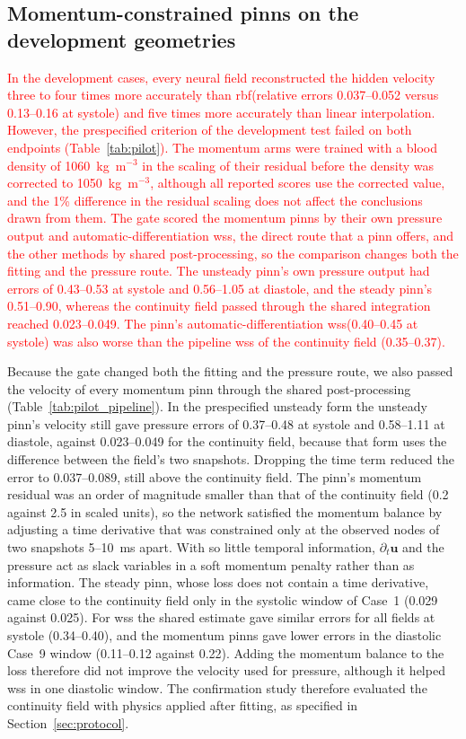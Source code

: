 \documentclass[12pt,a4paper]{article}
\newcommand{\PINN}{\ac{pinn}\xspace}
\newcommand{\PINNs}{\acp{pinn}\xspace}
\newcommand{\WSS}{\ac{wss}\xspace}
\newcommand{\RBF}{\ac{rbf}\xspace}
\theoremstyle{definition}
\numberwithin{equation}{section}
\newcommand{\revision}[1]{\textcolor{red}{#1}}
\begin{document}


\subsection{Momentum-constrained \texorpdfstring{\PINNs}{PINNs} on the development geometries}
\label{sec:pilot_results}
\revision{In the development cases, every neural field reconstructed the hidden velocity three to four times more accurately than \RBF (relative errors 0.037--0.052 versus 0.13--0.16 at systole) and five times more accurately than linear interpolation. However, the prespecified criterion of the development test failed on both endpoints (Table~\ref{tab:pilot}). The momentum arms were trained with a blood density of 1060~kg~m$^{-3}$ in the scaling of their residual before the density was corrected to 1050~kg~m$^{-3}$, although all reported scores use the corrected value, and the 1\% difference in the residual scaling does not affect the conclusions drawn from them. The gate scored the momentum \PINNs by their own pressure output and automatic-differentiation \WSS, the direct route that a \PINN offers, and the other methods by shared post-processing, so the comparison changes both the fitting and the pressure route. The unsteady \PINN's own pressure output had errors of 0.43--0.53 at systole and 0.56--1.05 at diastole, and the steady \PINN's 0.51--0.90, whereas the continuity field passed through the shared integration reached 0.023--0.049. The \PINN's automatic-differentiation \WSS (0.40--0.45 at systole) was also worse than the pipeline \WSS of the continuity field (0.35--0.37).}

Because the gate changed both the fitting and the pressure route, we also passed the velocity of every momentum \PINN through the shared post-processing (Table~\ref{tab:pilot_pipeline}). In the prespecified unsteady form the unsteady \PINN's velocity still gave pressure errors of 0.37--0.48 at systole and 0.58--1.11 at diastole, against 0.023--0.049 for the continuity field, because that form uses the difference between the field's two snapshots. Dropping the time term reduced the error to 0.037--0.089, still above the continuity field. The \PINN's momentum residual was an order of magnitude smaller than that of the continuity field (0.2 against 2.5 in scaled units), so the network satisfied the momentum balance by adjusting a time derivative that was constrained only at the observed nodes of two snapshots 5--10~ms apart. With so little temporal information, $\partial_t\mathbf u$ and the pressure act as slack variables in a soft momentum penalty rather than as information. The steady \PINN, whose loss does not contain a time derivative, came close to the continuity field only in the systolic window of Case~1 (0.029 against 0.025). For \WSS the shared estimate gave similar errors for all fields at systole (0.34--0.40), and the momentum \PINNs gave lower errors in the diastolic Case~9 window (0.11--0.12 against 0.22). Adding the momentum balance to the loss therefore did not improve the velocity used for pressure, although it helped \WSS in one diastolic window. The confirmation study therefore evaluated the continuity field with physics applied after fitting, as specified in Section~\ref{sec:protocol}.
\end{document}
